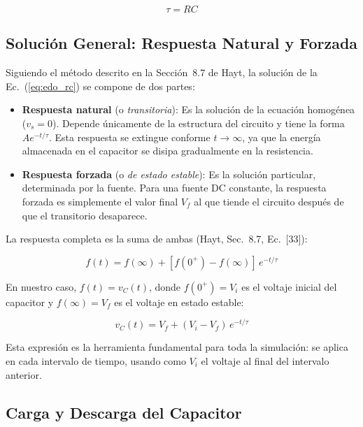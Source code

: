 \documentclass[12pt,a4paper]{article}
\begin{document}
\begin{equation}
    \boxed{\tau = RC}
    \label{eq:tau}
\end{equation}

\subsection{Soluci\'on General: Respuesta Natural y Forzada}

Siguiendo el m\'etodo descrito en la Secci\'on~8.7 de Hayt, la soluci\'on de la Ec.~(\ref{eq:edo_rc}) se compone de dos partes:

\begin{itemize}
    \item \textbf{Respuesta natural} (o \textit{transitoria}): Es la soluci\'on de la ecuaci\'on homog\'enea ($v_s = 0$). Depende \'unicamente de la estructura del circuito y tiene la forma $Ae^{-t/\tau}$. Esta respuesta se extingue conforme $t \to \infty$, ya que la energ\'ia almacenada en el capacitor se disipa gradualmente en la resistencia.
    \item \textbf{Respuesta forzada} (o \textit{de estado estable}): Es la soluci\'on particular, determinada por la fuente. Para una fuente DC constante, la respuesta forzada es simplemente el valor final $V_f$ al que tiende el circuito despu\'es de que el transitorio desaparece.
\end{itemize}

La respuesta completa es la suma de ambas (Hayt, Sec.~8.7, Ec.~[33]):

\begin{equation}
    \boxed{f(t) = f(\infty) + [f(0^+) - f(\infty)]\, e^{-t/\tau}}
    \label{eq:solucion_general}
\end{equation}

En nuestro caso, $f(t) = v_C(t)$, donde $f(0^+) = V_i$ es el voltaje inicial del capacitor y $f(\infty) = V_f$ es el voltaje en estado estable:

\begin{equation}
    v_C(t) = V_f + (V_i - V_f)\, e^{-t/\tau}
    \label{eq:solucion_vc}
\end{equation}

Esta expresi\'on es la herramienta fundamental para toda la simulaci\'on: se aplica en cada intervalo de tiempo, usando como $V_i$ el voltaje al final del intervalo anterior.

\subsection{Carga y Descarga del Capacitor}
\end{document}
